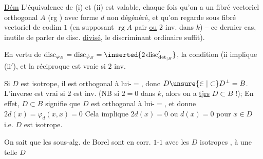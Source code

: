 \uline{Dém} L'équivalence de (i) et (ii) est valable, chaque fois qu'on a un fibré vectoriel orthogonal $A$ (rg ) avec forme $d$ non dégénéré, et qu'on regarde    sous fibré vectoriel de codim $1$ (en supposant $\operatorname{rg}A$ pair \uline{ou} $2$ inv. dans $k$) --   ce dernier cas, inutile de parler de disc. \uline{divisé}, le discriminant ordinaire suffit).

En vertu de $\operatorname{disc}_{\varphi_B}=\operatorname{disc}_{\psi_B}=\inserted{2\operatorname{disc}'_{\det_{\mid B}}}$,  la condition (ii\unsure{)} implique (ii$'$), et la réciproque est vraie si $2$ inv.

 Si $D$ est isotrope, il est orthogonal à lui-$=$, donc $D\unsure{\in|\subset}D^\perp=B$. L'inverse est vrai si $2$ est inv. (NB si $2=0$ dans $k$, alors on a \uline{tjrs} $D\subset B$ !); En effet, $D\subset B$ signifie que $D$ est orthogonal à lui-$=$, et donne $2d(x)=\varphi_d(x,x)=0$ Cela implique $2d(x)=0$ ou $d(x)=0$ pour $x\in D$ i.e. $D$ est isotrope.

On sait que les sous-alg. de Borel sont en corr. $1$-$1$ avec les $D$ isotropes , à  une telle $D$
